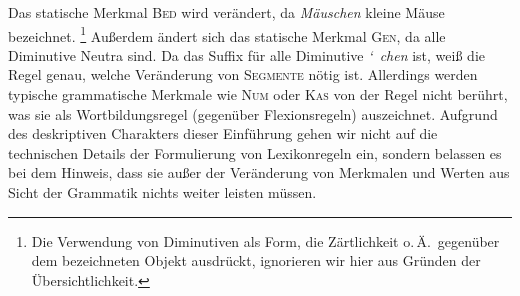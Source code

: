 \begin{exe}
\end{exe}

Das statische Merkmal \textsc{Bed} wird verändert, da \textit{Mäuschen} kleine Mäuse bezeichnet.%
\footnote{Die Verwendung von Diminutiven als Form, die Zärtlichkeit o.\,Ä.\ gegenüber dem bezeichneten Objekt ausdrückt, ignorieren wir hier aus Gründen der Übersichtlichkeit.}
Außerdem ändert sich das statische Merkmal \textsc{Gen}, da alle Diminutive Neutra sind.
Da das Suffix für alle Diminutive \mbox{\textit{\char`~chen}} ist, weiß die Regel genau, welche Veränderung von \textsc{Segmente} nötig ist.
Allerdings werden typische grammatische Merkmale wie \textsc{Num} oder \textsc{Kas} von der Regel nicht berührt, was sie als Wortbildungsregel (gegenüber Flexionsregeln) auszeichnet.
Aufgrund des deskriptiven Charakters dieser Einführung gehen wir nicht auf die technischen Details der Formulierung von Lexikonregeln ein, sondern belassen es bei dem Hinweis, dass sie außer der Veränderung von Merkmalen und Werten aus Sicht der Grammatik nichts weiter leisten müssen.




